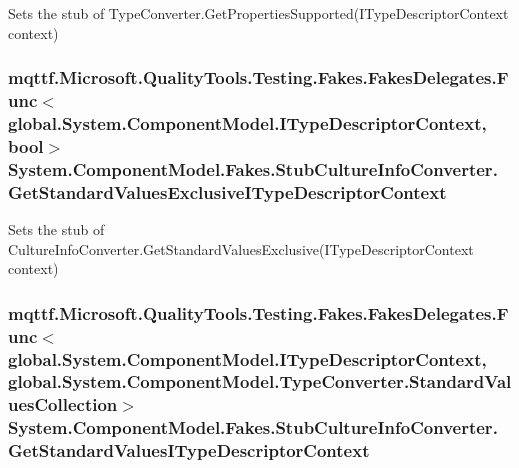 Sets the stub of Type\-Converter.\-Get\-Properties\-Supported(\-I\-Type\-Descriptor\-Context context)

\hypertarget{class_system_1_1_component_model_1_1_fakes_1_1_stub_culture_info_converter_af0c2c3f09f63b77cfe161c4d6814253e}{
\subsubsection[{Get\-Standard\-Values\-Exclusive\-I\-Type\-Descriptor\-Context}]{\setlength{\rightskip}{0pt plus 5cm}mqttf.\-Microsoft.\-Quality\-Tools.\-Testing.\-Fakes.\-Fakes\-Delegates.\-Func$<$global.\-System.\-Component\-Model.\-I\-Type\-Descriptor\-Context, bool$>$ System.\-Component\-Model.\-Fakes.\-Stub\-Culture\-Info\-Converter.\-Get\-Standard\-Values\-Exclusive\-I\-Type\-Descriptor\-Context}}\label{class_system_1_1_component_model_1_1_fakes_1_1_stub_culture_info_converter_af0c2c3f09f63b77cfe161c4d6814253e}


Sets the stub of Culture\-Info\-Converter.\-Get\-Standard\-Values\-Exclusive(\-I\-Type\-Descriptor\-Context context)

\hypertarget{class_system_1_1_component_model_1_1_fakes_1_1_stub_culture_info_converter_af58581959e9ecc990a5072544da12d45}{
\subsubsection[{Get\-Standard\-Values\-I\-Type\-Descriptor\-Context}]{\setlength{\rightskip}{0pt plus 5cm}mqttf.\-Microsoft.\-Quality\-Tools.\-Testing.\-Fakes.\-Fakes\-Delegates.\-Func$<$global.\-System.\-Component\-Model.\-I\-Type\-Descriptor\-Context, global.\-System.\-Component\-Model.\-Type\-Converter.\-Standard\-Values\-Collection$>$ System.\-Component\-Model.\-Fakes.\-Stub\-Culture\-Info\-Converter.\-Get\-Standard\-Values\-I\-Type\-Descriptor\-Context}}\label{class_system_1_1_component_model_1_1_fakes_1_1_stub_culture_info_converter_af58581959e9ecc990a5072544da12d45}


